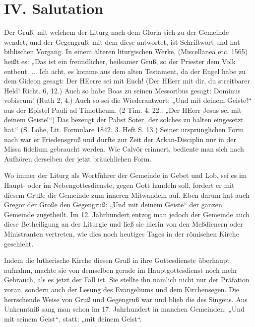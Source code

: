 \chapter{IV. Salutation}


Der Gruß, mit welchem der Liturg nach dem Gloria sich zu der Gemeinde wendet, und der Gegengruß, mit dem diese antwortet, ist Schriftwort und hat biblischen Vorgang. In einem älteren liturgischen Werke, (Miscellanea etc. 1565) heißt es: „Das ist ein freundlicher, heilsamer Gruß, so der Priester dem Volk entbeut. ... Ich acht, es komme aus dem alten Testament,
da der Engel habe zu dem Gideon gesagt: Der HEerre sei mit Euch! (Der HEerr mit dir, du streitbarer Held! Richt. 6, 12.) Auch so habe Boas zu seinen Messoribus gesagt: Dominus vobiscum! (Ruth 2, 4.) Auch so sei die Wiederantwort: „Und mit deinem Geiste!“ aus der Epistel Pauli ad Timotheum. (2 Tim. 4, 22.: „Der HEerr Jesus sei mit deinem Geiste!“) Das bezeugt der Pabst Soter, der solches zu halten eingesetzt hat.“ (S. Löhe, Lit. Formulare 1842. 3. Heft S. 13.) Seiner ursprünglichen Form nach war er Friedensgruß und durfte zur Zeit der Arkan-Disciplin nur in der Missa fidelium gebraucht werden. Wie Calvör erinnert, bediente man sich nach Aufhören derselben der jetzt bräuchlichen Form.

Wo immer der Liturg als Wortführer der Gemeinde in Gebet und Lob, sei es im Haupt- oder im Nebengottesdienste, gegen Gott handeln soll, fordert er mit diesem Gruße die Gemeinde zum inneren Mitwandeln auf. Eben darum hat auch Gregor der Große den Gegengruß: „Und mit deinem Geiste“ der ganzen Gemeinde zugetheilt. Im 12. Jahrhundert entzog man jedoch der Gemeinde auch diese Betheiligung an der Liturgie und ließ sie hierin von den Meßdienern oder Ministranten vertreten, wie dies noch heutiges Tages in der römischen Kirche geschieht.

Indem die lutherische Kirche diesen Gruß in ihre Gottesdienste überhaupt aufnahm, machte sie von demselben gerade im Hauptgottesdienst noch mehr Gebrauch, als es jetzt der Fall ist. Sie stellte ihn nämlich nicht nur der Präfation voran, sondern auch der Lesung des Evangeliums und dem Kirchensegen. Die herrschende Weise von Gruß und Gegengruß war und blieb die des Singens. Aus Unkenntniß sang man schon im 17. Jahrhundert in manchen Gemeinden: „Und mit seinem Geist“, statt: „mit deinem Geist“.

